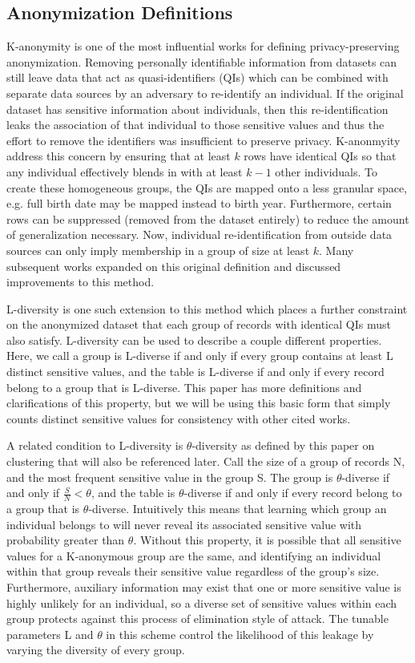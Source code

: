 \subsection{Anonymization Definitions}
K-anonymity\cite{sweeneykAnonymity} is one of the most influential works for defining privacy-preserving anonymization. Removing personally identifiable information from datasets can still leave data that act as quasi-identifiers (QIs) which can be combined with separate data sources by an adversary to re-identify an individual. If the original dataset has sensitive information about individuals, then this re-identification leaks the association of that individual to those sensitive values and thus the effort to remove the identifiers was insufficient to preserve privacy. K-anonmyity address this concern by ensuring that at least $k$ rows have identical QIs so that any individual effectively blends in with at least $k-1$ other individuals. To create these homogeneous groups, the QIs are mapped onto a less granular space, e.g. full birth date may be mapped instead to birth year. Furthermore, certain rows can be suppressed (removed from the dataset entirely) to reduce the amount of generalization necessary. Now, individual re-identification from outside data sources can only imply membership in a group of size at least $k$. Many subsequent works expanded on this original definition and discussed improvements to this method.

L-diversity\cite{machanavajjhalalDiversity} is one such extension to this method which places a further constraint on the anonymized dataset that each group of records with identical QIs must also satisfy. L-diversity can be used to describe a couple different properties. Here, we call a group is L-diverse if and only if every group contains at least L distinct sensitive values, and the table is L-diverse if and only if every record belong to a group that is L-diverse. This paper has more definitions and clarifications of this property, but we will be using this basic form that simply counts distinct sensitive values for consistency with other cited works.

A related condition to L-diversity is $\theta$-diversity as defined by this paper\cite{yangEnhanced} on clustering that will also be referenced later. Call the size of a group of records N, and the most frequent sensitive value in the group S. The group is $\theta$-diverse if and only if $\frac{S}{N}<\theta$, and the table is $\theta$-diverse if and only if every record belong to a group that is $\theta$-diverse. Intuitively this means that learning which group an individual belongs to will never reveal its associated sensitive value with probability greater than $\theta$. Without this property, it is possible that all sensitive values for a K-anonymous group are the same, and identifying an individual within that group reveals their sensitive value regardless of the group's size. Furthermore, auxiliary information may exist that one or more sensitive value is highly unlikely for an individual, so a diverse set of sensitive values within each group protects against this process of elimination style of attack. The tunable parameters L and $\theta$ in this scheme control the likelihood of this leakage by varying the diversity of every group.

